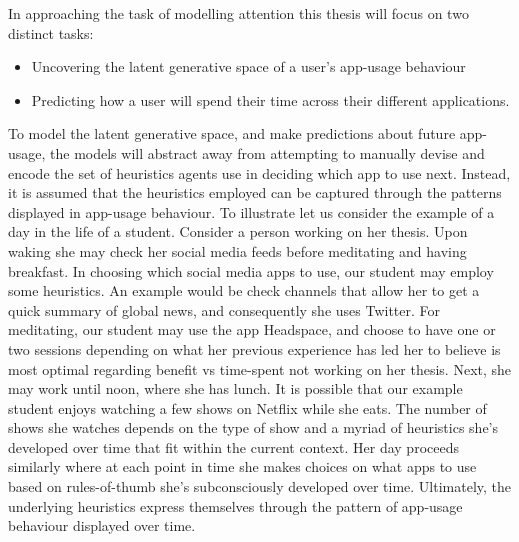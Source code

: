  In approaching the task of modelling attention this thesis will focus on two distinct tasks:

 \begin{itemize}
     \item Uncovering the latent generative space of a user's app-usage behaviour
     \item Predicting how a user will spend their time across their different applications.
 \end{itemize}

 To model the latent generative space, and make predictions about future app-usage, the models will abstract away from attempting to manually devise and encode the set of heuristics agents use in deciding which app to use next. Instead, it is assumed that the heuristics employed can be captured through the patterns displayed in app-usage behaviour. To illustrate let us consider the example of a day in the life of a student. Consider a person working on her thesis. Upon waking she may check her social media feeds before meditating and having breakfast. In choosing which social media apps to use, our student may employ some heuristics. An example would be check channels that allow her to get a quick summary of global news, and consequently she uses Twitter. For meditating, our student may use the app Headspace, and choose to have one or two sessions depending on what her previous experience has led her to believe is most optimal regarding benefit vs time-spent not working on her thesis. Next, she may work until noon, where she has lunch. It is possible that our example student enjoys watching a few shows on Netflix while she eats. The number of shows she watches depends on the type of show and a myriad of heuristics she's developed over time that fit within the current context. Her day proceeds similarly where at each point in time she makes choices on what apps to use based on rules-of-thumb she's subconsciously developed over time. Ultimately, the underlying heuristics express themselves through the pattern of app-usage behaviour displayed over time. \\

